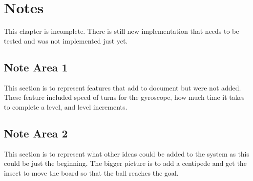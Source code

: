
\chapter{Notes}
\label{loc:Notes}


This chapter is incomplete. There is still new implementation that needs to be tested and was not implemented just yet.

\section{Note Area 1}
\label{loc:Notes_1}


This section is to represent features that add to document but were not added. These feature included speed of turns for the gyroscope, how much time it takes to complete a level, and level increments.

\section{Note Area 2}
\label{loc:Notes_2}


This section is to represent what other ideas could be added to the system as this could be just the beginning. The bigger picture is to add a centipede and get the insect to move the board so that the ball reaches the goal.


